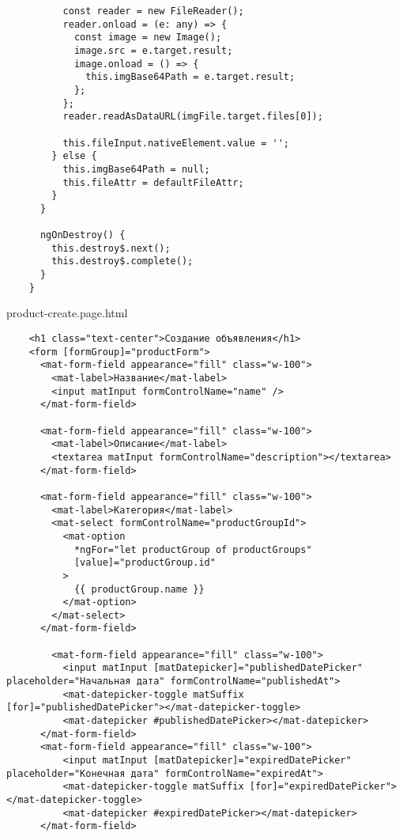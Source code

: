 \begin{lstlisting}
          const reader = new FileReader();
          reader.onload = (e: any) => {
            const image = new Image();
            image.src = e.target.result;
            image.onload = () => {
              this.imgBase64Path = e.target.result;
            };
          };
          reader.readAsDataURL(imgFile.target.files[0]);
    
          this.fileInput.nativeElement.value = '';
        } else {
          this.imgBase64Path = null;
          this.fileAttr = defaultFileAttr;
        }
      }
    
      ngOnDestroy() {
        this.destroy$.next();
        this.destroy$.complete();
      }
    }    
\end{lstlisting}

product-create.page.html
\begin{lstlisting}
    <h1 class="text-center">Создание объявления</h1>
    <form [formGroup]="productForm">
      <mat-form-field appearance="fill" class="w-100">
        <mat-label>Название</mat-label>
        <input matInput formControlName="name" />
      </mat-form-field>
    
      <mat-form-field appearance="fill" class="w-100">
        <mat-label>Описание</mat-label>
        <textarea matInput formControlName="description"></textarea>
      </mat-form-field>
    
      <mat-form-field appearance="fill" class="w-100">
        <mat-label>Категория</mat-label>
        <mat-select formControlName="productGroupId">
          <mat-option
            *ngFor="let productGroup of productGroups"
            [value]="productGroup.id"
          >
            {{ productGroup.name }}
          </mat-option>
        </mat-select>
      </mat-form-field>
    
        <mat-form-field appearance="fill" class="w-100">
          <input matInput [matDatepicker]="publishedDatePicker" placeholder="Начальная дата" formControlName="publishedAt">
          <mat-datepicker-toggle matSuffix [for]="publishedDatePicker"></mat-datepicker-toggle>
          <mat-datepicker #publishedDatePicker></mat-datepicker>
      </mat-form-field>
      <mat-form-field appearance="fill" class="w-100">
          <input matInput [matDatepicker]="expiredDatePicker" placeholder="Конечная дата" formControlName="expiredAt">
          <mat-datepicker-toggle matSuffix [for]="expiredDatePicker"></mat-datepicker-toggle>
          <mat-datepicker #expiredDatePicker></mat-datepicker>
      </mat-form-field>
    

\end{lstlisting}

